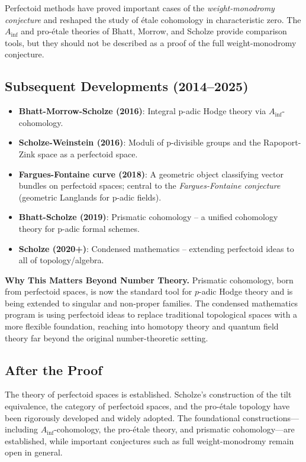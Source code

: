 \begin{highlightbox}
Perfectoid methods have proved important cases of the \emph{weight-monodromy conjecture} and reshaped the study of \'etale cohomology in characteristic zero. The $A_{\mathrm{inf}}$ and pro-\'etale theories of Bhatt, Morrow, and Scholze provide comparison tools, but they should not be described as a proof of the full weight-monodromy conjecture.
\end{highlightbox}

\subsection{Subsequent Developments (2014--2025)}
\begin{itemize}
\item \textbf{Bhatt-Morrow-Scholze (2016)}: Integral p-adic Hodge theory via $A_{\text{inf}}$-cohomology.
\item \textbf{Scholze-Weinstein (2016)}: Moduli of p-divisible groups and the Rapoport-Zink space as a perfectoid space.
\item \textbf{Fargues-Fontaine curve (2018)}: A geometric object classifying vector bundles on perfectoid spaces; central to the \emph{Fargues-Fontaine conjecture} (geometric Langlands for p-adic fields).
\item \textbf{Bhatt-Scholze (2019)}: Prismatic cohomology -- a unified cohomology theory for p-adic formal schemes.
\item \textbf{Scholze (2020+)}: Condensed mathematics -- extending perfectoid ideas to all of topology/algebra.
\end{itemize}

\textbf{Why This Matters Beyond Number Theory.} Prismatic cohomology, born from perfectoid spaces, is now the standard tool for $p$-adic Hodge theory and is being extended to singular and non-proper families. The condensed mathematics program is using perfectoid ideas to replace traditional topological spaces with a more flexible foundation, reaching into homotopy theory and quantum field theory far beyond the original number-theoretic setting.

\subsection{After the Proof}

The theory of perfectoid spaces is established. Scholze's construction of the tilt equivalence, the category of perfectoid spaces, and the pro-étale topology have been rigorously developed and widely adopted. The foundational constructions---including $A_{\mathrm{inf}}$-cohomology, the pro-étale theory, and prismatic cohomology---are established, while important conjectures such as full weight-monodromy remain open in general.

